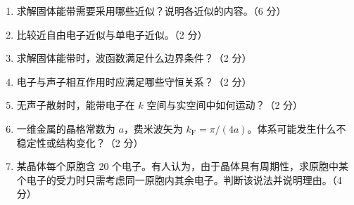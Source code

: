 \begin{question}[20 分]
\begin{enumerate}
  \item 求解固体能带需要采用哪些近似？说明各近似的内容。（6 分）
  \item 比较近自由电子近似与单电子近似。（2 分）
  \item 求解固体能带时，波函数满足什么边界条件？（2 分）
  \item 电子与声子相互作用时应满足哪些守恒关系？（2 分）
  \item 无声子散射时，能带电子在 $k$ 空间与实空间中如何运动？（2 分）
  \item 一维金属的晶格常数为 $a$，费米波矢为 $k_{\mathrm F}=\pi/(4a)$。体系可能发生什么不稳定性或结构变化？（2 分）
  \item 某晶体每个原胞含 20 个电子。有人认为，由于晶体具有周期性，求原胞中某个电子的受力时只需考虑同一原胞内其余电子。判断该说法并说明理由。（4 分）
\end{enumerate}



\end{question}
